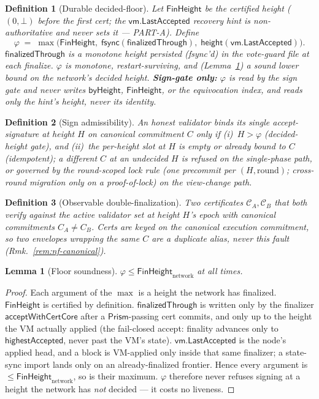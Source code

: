\documentclass[11pt]{article}
\newtheorem{lemma}[theorem]{Lemma}
\newtheorem{definition}{Definition}
\begin{document}
\begin{definition}[Durable decided-floor]
\label{def:nf-floor}
Let $\mathsf{FinHeight}$ be the certified height ($(0,\bot)$ before the
first cert; the $\mathsf{vm.LastAccepted}$ recovery hint is
non-authoritative and never sets it --- \emph{PART-A}). Define
\[
  \varphi \;=\; \max\!\bigl(
     \mathsf{FinHeight},\;
     \mathsf{fsync}(\mathsf{finalizedThrough}),\;
     \mathsf{height}(\mathsf{vm.LastAccepted})\bigr).
\]
$\mathsf{finalizedThrough}$ is a monotone height persisted (fsync'd)
in the vote-guard file at each finalize. $\varphi$ is monotone,
restart-surviving, and (Lemma~\ref{lem:nf-lowerbound}) a sound lower
bound on the network's decided height. \textbf{Sign-gate only:}
$\varphi$ is read by the sign gate and never writes $\mathsf{byHeight}$,
$\mathsf{FinHeight}$, or the equivocation index, and reads only the
hint's \emph{height}, never its identity.
\end{definition}

\begin{definition}[Sign admissibility]
\label{def:nf-admissible}
An honest validator binds its single accept-signature at height $H$ on
canonical commitment $C$ only if (i)~$H > \varphi$ (decided-height
gate), and (ii)~the per-height slot at $H$ is empty or already bound to
$C$ (idempotent); a different $C$ at an undecided $H$ is refused on the
single-phase path, or governed by the round-scoped lock rule
(one precommit per $(H,\mathrm{round})$; cross-round migration only on a
proof-of-lock) on the view-change path.
\end{definition}

\begin{definition}[Observable double-finalization]
\label{def:nf-double}
Two certificates $\mathcal{C}_A, \mathcal{C}_B$ that both verify against
the active validator set at height $H$'s epoch with canonical
commitments $C_A \ne C_B$. Certs are keyed on the \emph{canonical
execution commitment}, so two envelopes wrapping the same $C$ are a
duplicate alias, never this fault (Rmk.~\ref{rem:nf-canonical}).
\end{definition}

\begin{lemma}[Floor soundness]
\label{lem:nf-lowerbound}
$\varphi \le \mathsf{FinHeight}_{\mathrm{network}}$ at all times.
\end{lemma}
\begin{proof}
Each argument of the $\max$ is a height the network has finalized.
$\mathsf{FinHeight}$ is certified by definition.
$\mathsf{finalizedThrough}$ is written only by the finalizer
$\mathsf{acceptWithCertCore}$ after a $\mathsf{Prism}$-passing cert
commits, and only up to the height the VM actually applied (the
fail-closed accept: finality advances only to $\mathsf{highestAccepted}$,
never past the VM's state). $\mathsf{vm.LastAccepted}$ is the node's
applied head, and a block is VM-applied only inside that same finalizer;
a state-sync import lands only on an already-finalized frontier. Hence
every argument is $\le \mathsf{FinHeight}_{\mathrm{network}}$, so is
their maximum. $\varphi$ therefore never refuses signing at a height the
network has \emph{not} decided --- it costs no liveness.
\end{proof}
\end{document}
